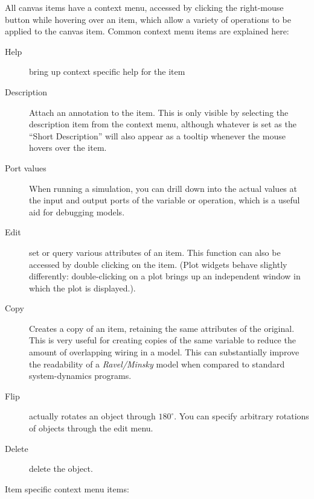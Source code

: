 All canvas items have a context menu, accessed by clicking the right-mouse
button while hovering over an item, which allow a variety of operations
to be applied to the canvas item. Common context menu items are explained
here: 
\begin{description}
\item [{Help}] bring up context specific help for the item 
\item [{Description}] Attach an annotation to the item. This is only visible
by selecting the description item from the context menu, although
whatever is set as the ``Short Description'' will also appear as
a tooltip whenever the mouse hovers over the item. 
\item [{Port values}] When running a simulation, you can drill down into
the actual values at the input and output ports of the variable or
operation, which is a useful aid for debugging models. 
\item [{Edit}] set or query various attributes of an item. This function
can also be accessed by double clicking on the item. (Plot widgets
behave slightly differently: double-clicking on a plot brings up an
independent window in which the plot is displayed.). 
\item [{Copy}] Creates a copy of an item, retaining the same attributes
of the original. This is very useful for creating copies of the same
variable to reduce the amount of overlapping wiring in a model. This
can substantially improve the readability of a \emph{Ravel/Minsky}
model when compared to standard system-dynamics programs.
\item [{Flip}] actually rotates an object through $180^{\circ}$. You can
specify arbitrary rotations of objects through the edit menu. 
\item [{Delete}] delete the object. 
\end{description}
Item specific context menu items: 
